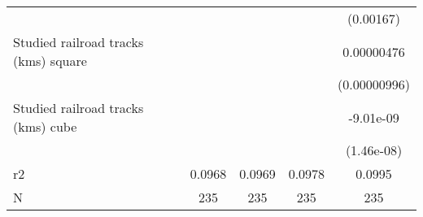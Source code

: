 {\begin{tabular}{l*{4}{c}}
                    &                     &                     &                     &   (0.00167)         \\
[1em]
Studied railroad tracks (kms) square&                     &                     &                     &  0.00000476         \\
                    &                     &                     &                     &(0.00000996)         \\
[1em]
Studied railroad tracks (kms) cube&                     &                     &                     &   -9.01e-09         \\
                    &                     &                     &                     &  (1.46e-08)         \\
\hline
r2                  &      0.0968         &      0.0969         &      0.0978         &      0.0995         \\
N                   &         235         &         235         &         235         &         235         \\
\hline\hline
\end{tabular}
}
